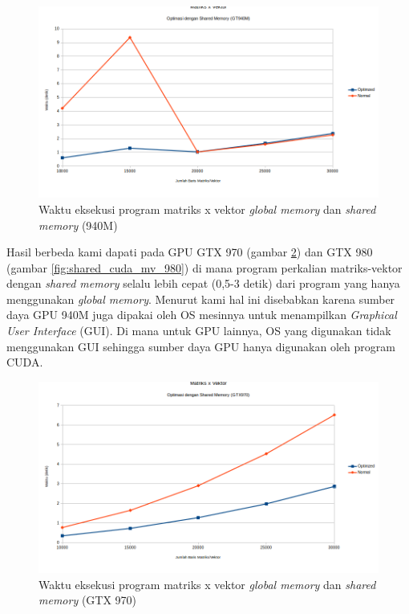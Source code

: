 \begin{figure}
	\centering
	\includegraphics[width=1\textwidth]
	{pics/shared_cuda_mv_940}
	\caption{Waktu eksekusi program matriks x vektor \textit{global memory} dan \textit{shared memory} (940M)}
	\label{fig:shared_cuda_mv_940}
\end{figure}  

Hasil berbeda kami dapati pada GPU GTX 970 (gambar \ref{fig:shared_cuda_mv_970}) dan GTX 980 (gambar \ref{fig:shared_cuda_mv_980}) di mana program perkalian matriks-vektor dengan \textit{shared memory} selalu lebih cepat (0,5-3 detik) dari program yang hanya menggunakan \textit{global memory}. Menurut kami hal ini disebabkan karena sumber daya GPU 940M juga dipakai oleh OS mesinnya untuk menampilkan \textit{Graphical User Interface} (GUI). Di mana untuk GPU lainnya, OS yang digunakan tidak menggunakan GUI sehingga sumber daya GPU hanya digunakan oleh program CUDA.

\begin{figure}
	\centering
	\includegraphics[width=1\textwidth]
	{pics/shared_cuda_mv_970}
	\caption{Waktu eksekusi program matriks x vektor \textit{global memory} dan \textit{shared memory} (GTX 970)}
	\label{fig:shared_cuda_mv_970}
\end{figure}  

